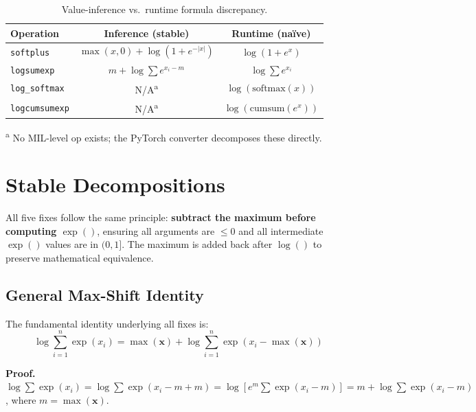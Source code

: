 \documentclass[10pt,twocolumn]{article}
\begin{document}
\begin{table}[h]
\centering
\caption{Value-inference vs.\ runtime formula discrepancy.}
\label{tab:discrepancy}
\small
\begin{tabular}{@{}l@{\hskip 4pt}c@{\hskip 4pt}c@{}}
\toprule
\textbf{Operation} & \textbf{Inference (stable)} & \textbf{Runtime (na\"ive)} \\
\midrule
\texttt{softplus} & ${\scriptstyle\max(x,0){+}\log(1{+}e^{-|x|})}$
  & ${\scriptstyle\log(1 {+} e^x)}$ \\
\texttt{logsumexp} & ${\scriptstyle m {+} \log \!\sum e^{x_i - m}}$
  & ${\scriptstyle\log \!\sum e^{x_i}}$ \\
\texttt{log\_softmax} & N/A\textsuperscript{a}
  & ${\scriptstyle\log(\mathrm{softmax}(x))}$ \\
\texttt{logcumsumexp} & N/A\textsuperscript{a}
  & ${\scriptstyle\log(\mathrm{cumsum}(e^x))}$ \\
\bottomrule
\end{tabular}

\vspace{2pt}
{\footnotesize \textsuperscript{a} No MIL-level op exists; the
PyTorch converter decomposes these directly.}
\end{table}

\section{Stable Decompositions}
\label{sec:fixes}

All five fixes follow the same principle: \textbf{subtract the
maximum before computing $\exp()$}, ensuring all arguments are
$\leq 0$ and all intermediate $\exp()$ values are in $(0, 1]$.
The maximum is added back after $\log()$ to preserve mathematical
equivalence.

\subsection{General Max-Shift Identity}
\label{sec:maxshift}

The fundamental identity underlying all fixes is:
\begin{equation}
  \log \sum_{i=1}^{n} \exp(x_i) =
  \max(\mathbf{x}) + \log \sum_{i=1}^{n} \exp(x_i - \max(\mathbf{x}))
  \label{eq:maxshift}
\end{equation}

\textbf{Proof.}
$\log \sum \exp(x_i) = \log \sum \exp(x_i - m + m)
= \log \left[ e^m \sum \exp(x_i - m) \right]
= m + \log \sum \exp(x_i - m)$,
where $m = \max(\mathbf{x})$.
\end{document}
